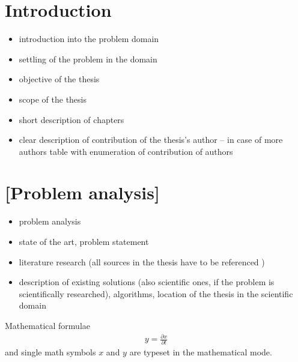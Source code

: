 \documentclass[a4paper,twoside,12pt]{book}
\newcounter{pagesWithoutNumbers}
\begin{document}
\tableofcontents

\setcounter{pagesWithoutNumbers}{\value{page}}
\mainmatter
\pagestyle{empty}

\cleardoublepage

\pagestyle{PageNumbersChapterTitles}


\chapter{Introduction}

\begin{itemize}
\item introduction into the problem domain
\item settling of the problem in the domain
\item objective of the thesis 
\item scope of the thesis
\item short description of chapters
\item clear description of contribution of the thesis's author – in case of more authors table with enumeration of contribution of authors
\end{itemize}


\chapter{[Problem analysis]}

\begin{itemize}
\item  problem analysis
\item state of the art, problem statement
\item  literature research (all sources in the thesis have to be referenced \cite{bib:article,bib:book,bib:conference,bib:internet})
\item description of existing solutions (also scientific ones, if the problem is scientifically researched), algorithms,  location of the thesis in the scientific domain
\end{itemize}



Mathematical formulae  
\begin{align}
y = \frac{\partial x}{\partial t}
\end{align}
and single math symbols $x$ and $y$ are typeset in the mathematical mode.
\end{document}
